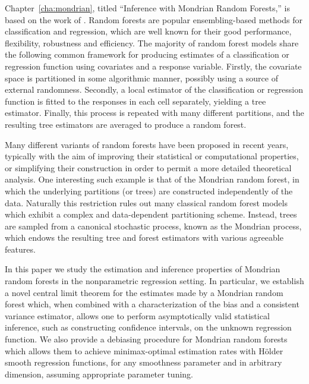 Chapter~\ref{cha:mondrian}, titled ``Inference with Mondrian Random Forests,''
is based on the work of \cite{cattaneo2023inference}.
Random forests are popular ensembling-based methods for classification and
regression, which are well known for their good performance, flexibility,
robustness and efficiency. The majority of random forest models share the
following common framework for producing estimates of a classification or
regression function using covariates and a response variable. Firstly, the
covariate space is partitioned in some algorithmic manner, possibly using a
source of external randomness. Secondly, a local estimator of the
classification or regression function is fitted to the responses in each cell
separately, yielding a tree estimator. Finally, this process
is repeated with many different partitions, and the resulting tree estimators
are averaged to produce a random forest.

Many different variants of random forests have been proposed in recent years,
typically with the aim of improving their statistical or computational
properties, or simplifying their construction in order to permit a more
detailed theoretical analysis.
One interesting such example is that of the Mondrian random forest, in which
the underlying partitions (or trees) are constructed independently of the data.
Naturally this restriction rules out many classical random forest models which
exhibit a complex and data-dependent partitioning scheme. Instead, trees are
sampled from a canonical stochastic process, known as the Mondrian process,
which endows the resulting tree and forest estimators with various agreeable
features.

In this paper we study the estimation and inference properties of Mondrian
random forests in the nonparametric regression setting. In particular, we
establish a novel central limit theorem for the estimates made by a Mondrian
random forest which, when combined with a characterization of the bias and a
consistent variance estimator, allows one to perform asymptotically valid
statistical inference, such as constructing confidence intervals, on the
unknown regression function. We also provide a debiasing procedure for Mondrian
random forests which allows them to achieve minimax-optimal estimation rates
with H{\"o}lder smooth regression functions, for any smoothness parameter and
in arbitrary dimension, assuming appropriate parameter tuning.


